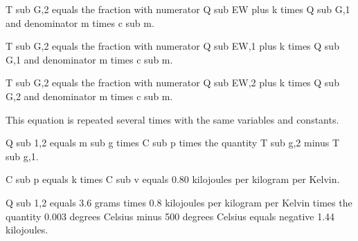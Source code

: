 T sub G,2 equals the fraction with numerator Q sub EW plus k times Q sub G,1 and denominator m times c sub m.

T sub G,2 equals the fraction with numerator Q sub EW,1 plus k times Q sub G,1 and denominator m times c sub m.

T sub G,2 equals the fraction with numerator Q sub EW,2 plus k times Q sub G,2 and denominator m times c sub m.

This equation is repeated several times with the same variables and constants.

Q sub 1,2 equals m sub g times C sub p times the quantity T sub g,2 minus T sub g,1.

C sub p equals k times C sub v equals 0.80 kilojoules per kilogram per Kelvin.

Q sub 1,2 equals 3.6 grams times 0.8 kilojoules per kilogram per Kelvin times the quantity 0.003 degrees Celsius minus 500 degrees Celsius equals negative 1.44 kilojoules.